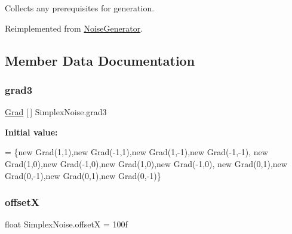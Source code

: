Collects any prerequisites for generation. 



Reimplemented from \mbox{\hyperlink{class_noise_generator_ad87355d424b537a1a4065d525ec18400}{Noise\+Generator}}.



\subsection{Member Data Documentation}
\mbox{\label{class_simplex_noise_a061de88e8e944eda8e5823a7e4dc7560}} 
\subsubsection{\texorpdfstring{grad3}{grad3}}
{\footnotesize\ttfamily \mbox{\hyperlink{class_simplex_noise_1_1_grad}{Grad}} \mbox{[}$\,$\mbox{]} Simplex\+Noise.\+grad3}

{\bfseries Initial value\+:}
\begin{DoxyCode}
= \{\textcolor{keyword}{new} Grad(1,1),\textcolor{keyword}{new} Grad(-1,1),\textcolor{keyword}{new} Grad(1,-1),\textcolor{keyword}{new} Grad(-1,-1),
                                     \textcolor{keyword}{new} Grad(1,0),\textcolor{keyword}{new} Grad(-1,0),\textcolor{keyword}{new} Grad(1,0),\textcolor{keyword}{new} Grad(-1,0),
                                     \textcolor{keyword}{new} Grad(0,1),\textcolor{keyword}{new} Grad(0,-1),\textcolor{keyword}{new} Grad(0,1),\textcolor{keyword}{new} Grad(0,-1)\}
\end{DoxyCode}
\mbox{\label{class_simplex_noise_aa55bdc3da38443283d578a7eda4987e3}} 
\subsubsection{\texorpdfstring{offsetX}{offsetX}}
{\footnotesize\ttfamily float Simplex\+Noise.\+offsetX = 100f}

\mbox{\label{class_simplex_noise_ae0fcfbb7ecbb42049f0d80b93a002c10}} 
